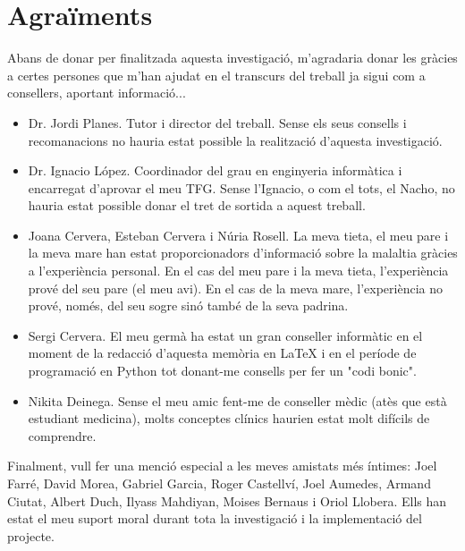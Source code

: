 \documentclass[a4paper,12pt]{article}
\begin{document}
\section*{Agraïments}
Abans de donar per finalitzada aquesta investigació, m'agradaria donar les gràcies a certes persones que m'han ajudat en el transcurs del treball ja sigui com a consellers, aportant informació...
\begin{itemize}
    \item Dr. Jordi Planes. Tutor i director del treball. Sense els seus consells i recomanacions no hauria estat possible la realització d'aquesta investigació.
    \item  Dr. Ignacio López. Coordinador del grau en enginyeria informàtica i encarregat d'aprovar el meu TFG. Sense l'Ignacio, o com el tots, el Nacho, no hauria estat possible donar el tret de sortida a aquest treball.
    \item Joana Cervera, Esteban Cervera i Núria Rosell. La meva tieta, el meu pare i la meva mare han estat proporcionadors d'informació sobre la malaltia gràcies a l'experiència personal. En el cas del meu pare i la meva tieta, l'experiència prové del seu pare (el meu avi). En el cas de la meva mare, l'experiència no prové, només, del seu sogre sinó també de la seva padrina.
    \item Sergi Cervera. El meu germà ha estat un gran conseller informàtic en el moment de la redacció d'aquesta memòria en LaTeX i en el període de programació en Python tot donant-me consells per fer un "codi bonic".
    \item Nikita Deinega. Sense el meu amic fent-me de conseller mèdic (atès que està estudiant medicina), molts conceptes clínics haurien estat molt difícils de comprendre.
\end{itemize}
Finalment, vull fer una menció especial a les meves amistats més íntimes: Joel Farré, David Morea, Gabriel Garcia, Roger Castellví, Joel Aumedes, Armand Ciutat, Albert Duch, Ilyass Mahdiyan, Moises Bernaus i Oriol Llobera. Ells han estat el meu suport moral durant tota la investigació i la implementació del projecte.
\end{document}
